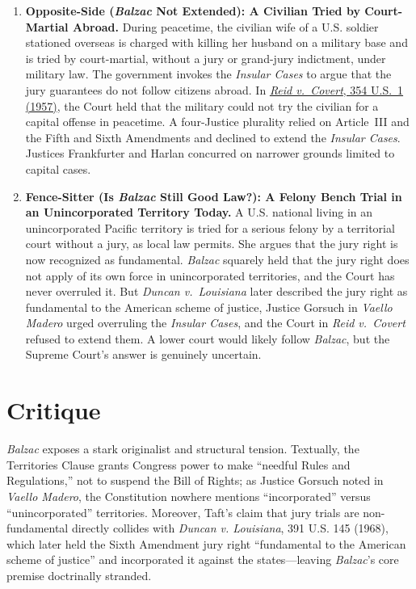\documentclass[12pt]{article}
\begin{document}
\begin{enumerate}
\item \textbf{Opposite-Side (\textit{Balzac} Not Extended): A Civilian Tried by Court-Martial Abroad.} During peacetime, the civilian wife of a U.S. soldier stationed overseas is charged with killing her husband on a military base and is tried by court-martial, without a jury or grand-jury indictment, under military law. The government invokes the \textit{Insular Cases} to argue that the jury guarantees do not follow citizens abroad. In \href{https://supreme.justia.com/cases/federal/us/354/1/}{\textit{Reid v.\ Covert}, 354 U.S.\ 1 (1957)}, the Court held that the military could not try the civilian for a capital offense in peacetime. A four-Justice plurality relied on Article~III and the Fifth and Sixth Amendments and declined to extend the \textit{Insular Cases}. Justices Frankfurter and Harlan concurred on narrower grounds limited to capital cases.

\item \textbf{Fence-Sitter (Is \textit{Balzac} Still Good Law?): A Felony Bench Trial in an Unincorporated Territory Today.} A U.S. national living in an unincorporated Pacific territory is tried for a serious felony by a territorial court without a jury, as local law permits. She argues that the jury right is now recognized as fundamental. \textit{Balzac} squarely held that the jury right does not apply of its own force in unincorporated territories, and the Court has never overruled it. But \textit{Duncan v.\ Louisiana} later described the jury right as fundamental to the American scheme of justice, Justice Gorsuch in \textit{Vaello Madero} urged overruling the \textit{Insular Cases}, and the Court in \textit{Reid v.\ Covert} refused to extend them. A lower court would likely follow \textit{Balzac}, but the Supreme Court's answer is genuinely uncertain.

\end{enumerate}

\section{Critique}
\textit{Balzac} exposes a stark originalist and structural tension. Textually, the Territories Clause grants Congress power to make ``needful Rules and Regulations,'' not to suspend the Bill of Rights; as Justice Gorsuch noted in \textit{Vaello Madero}, the Constitution nowhere mentions ``incorporated'' versus ``unincorporated'' territories. Moreover, Taft's claim that jury trials are non-fundamental directly collides with \textit{Duncan v. Louisiana}, 391 U.S. 145 (1968), which later held the Sixth Amendment jury right ``fundamental to the American scheme of justice'' and incorporated it against the states---leaving \textit{Balzac}'s core premise doctrinally stranded.
\end{document}
